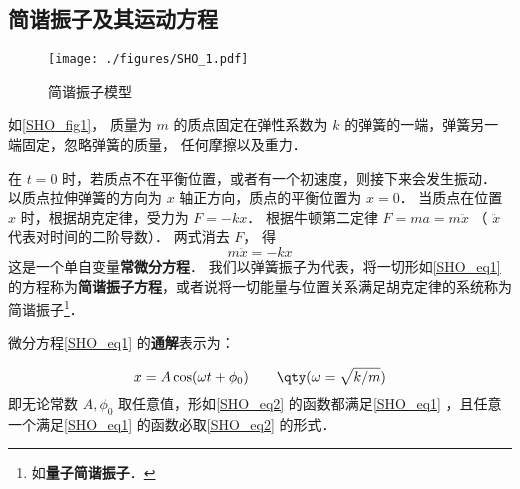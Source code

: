 


\subsection{简谐振子及其运动方程}

\begin{figure}[ht]
\centering
\texttt{[image: ./figures/SHO\_1.pdf]}
\caption{简谐振子模型} \label{SHO_fig1}
\end{figure}

如\autoref{SHO_fig1}， 质量为 $m$ 的质点固定在弹性系数为 $k$ 的弹簧的一端，弹簧另一端固定，忽略弹簧的质量， 任何摩擦以及重力．

在 $t = 0$ 时，若质点不在平衡位置，或者有一个初速度，则接下来会发生振动． 以质点拉伸弹簧的方向为 $x$ 轴正方向，质点的平衡位置为 $x = 0$． 当质点在位置 $x$ 时，根据胡克定律，受力为 $F =  - kx$． 根据牛顿第二定律 $F = ma = m\ddot x$ （ $\ddot x$ 代表对时间的二阶导数）．  两式消去 $F$， 得
\begin{equation}\label{SHO_eq1}
m\ddot x =  - kx
\end{equation}
这是一个单自变量\textbf{常微分方程}． 我们以弹簧振子为代表，将一切形如\autoref{SHO_eq1} 的方程称为\textbf{简谐振子方程}，或者说将一切能量与位置关系满足胡克定律的系统称为简谐振子\footnote{如\textbf{量子简谐振子}．}．



微分方程\autoref{SHO_eq1} 的\textbf{通解}表示为：

\begin{equation}\label{SHO_eq2}
x = A\cos(\omega t + \phi_0)  \qquad \qty(\omega  = \sqrt{k/m})
\end{equation}
即无论常数 $A, \phi_0$ 取任意值，形如\autoref{SHO_eq2} 的函数都满足\autoref{SHO_eq1} ，且任意一个满足\autoref{SHO_eq1} 的函数必取\autoref{SHO_eq2} 的形式．

